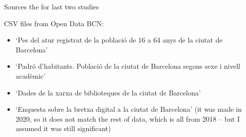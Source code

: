 \documentclass[8pt]{beamer}
\begin{document}
\begin{frame}{Sources the for last two studies}

CSV files from Open Data BCN:

\begin{itemize}
\item `Pes del atur registrat de la població de 16 a 64 anys de la ciutat de Barcelona'

\item `Padró d'habitants. Població de la ciutat de Barcelona segons sexe i nivell acadèmic'

\item `Dades de la xarxa de biblioteques de la ciutat de Barcelona'

\item `Enquesta sobre la bretxa digital a la ciutat de Barcelona' (it was made in 2020, so it does not match the rest of data, which is all from 2018 -- but I assumed it was still significant)
\end{itemize}
\end{frame}
\end{document}
